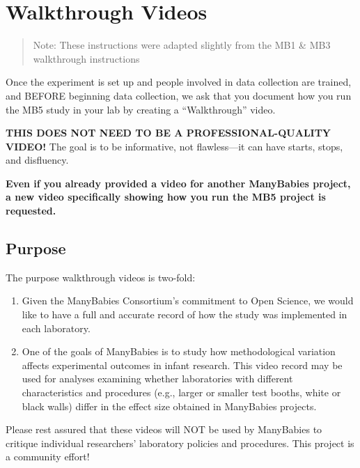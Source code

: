 \documentclass[
  letterpaper,
  DIV=11,
  numbers=noendperiod,
  oneside]{scrreprt}
\providecommand{\tightlist}{%
  \setlength{\itemsep}{0pt}\setlength{\parskip}{0pt}}
\begin{document}
\chapter{Walkthrough Videos}\label{sec-walkthrough}

\begin{quote}
Note: These instructions were adapted slightly from the MB1 \& MB3
walkthrough instructions
\end{quote}

Once the experiment is set up and people involved in data collection are
trained, and BEFORE beginning data collection, we ask that you document
how you run the MB5 study in your lab by creating a ``Walkthrough''
video.

\textbf{THIS DOES NOT NEED TO BE A PROFESSIONAL-QUALITY VIDEO!} The goal
is to be informative, not flawless---it can have starts, stops, and
disfluency.

\textbf{Even if you already provided a video for another ManyBabies
project, a new video specifically showing how you run the MB5 project is
requested.}

\section{Purpose}\label{purpose}

The purpose walkthrough videos is two-fold:

\begin{enumerate}
\def\labelenumi{\arabic{enumi}.}
\tightlist
\item
  Given the ManyBabies Consortium's commitment to Open Science, we would
  like to have a full and accurate record of how the study was
  implemented in each laboratory.
\item
  One of the goals of ManyBabies is to study how methodological
  variation affects experimental outcomes in infant research. This video
  record may be used for analyses examining whether laboratories with
  different characteristics and procedures (e.g., larger or smaller test
  booths, white or black walls) differ in the effect size obtained in
  ManyBabies projects.
\end{enumerate}

Please rest assured that these videos will NOT be used by ManyBabies to
critique individual researchers' laboratory policies and procedures.
This project is a community effort!
\end{document}
